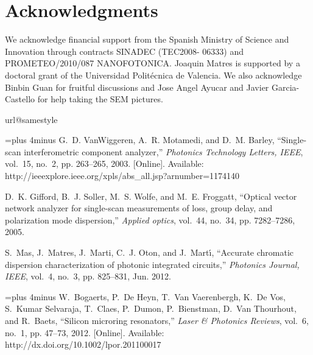 \documentclass[journal]{IEEEtran}
\begin{document}
\section*{Acknowledgments}
We acknowledge financial support from the Spanish Ministry of Science and Innovation through contracts SINADEC (TEC2008- 06333) and PROMETEO/2010/087 NANOFOTONICA. Joaquin Matres is supported by a doctoral grant of the Universidad Polit\'ecnica de Valencia. We also acknowledge Binbin Guan for fruitful discussions and Jose Angel Ayucar and Javier Garcia-Castello for help taking the SEM pictures.


\begin{thebibliography}{10}
\providecommand{\url}[1]{#1}
\csname url@samestyle\endcsname
\providecommand{\newblock}{\relax}
\providecommand{\bibinfo}[2]{#2}
\providecommand{\BIBentrySTDinterwordspacing}{\spaceskip=0pt\relax}
\providecommand{\BIBentryALTinterwordstretchfactor}{4}
\providecommand{\BIBentryALTinterwordspacing}{\spaceskip=\fontdimen2\font plus
\BIBentryALTinterwordstretchfactor\fontdimen3\font minus
  \fontdimen4\font\relax}
\providecommand{\BIBforeignlanguage}[2]{{%
\expandafter\ifx\csname l@#1\endcsname\relax
\typeout{** WARNING: IEEEtran.bst: No hyphenation pattern has been}%
\typeout{** loaded for the language `#1'. Using the pattern for}%
\typeout{** the default language instead.}%
\else
\language=\csname l@#1\endcsname
\fi
#2}}
\providecommand{\BIBdecl}{\relax}
\BIBdecl

\BIBentryALTinterwordspacing
G.~D. VanWiggeren, A.~R. Motamedi, and D.~M. Barley, ``{Single-scan
  interferometric component analyzer},'' \emph{Photonics Technology Letters,
  IEEE}, vol.~15, no.~2, pp. 263--265, 2003. [Online]. Available:
  \url{http://ieeexplore.ieee.org/xpls/abs\_all.jsp?arnumber=1174140}
\BIBentrySTDinterwordspacing

D.~K. Gifford, B.~J. Soller, M.~S. Wolfe, and M.~E. Froggatt, ``{Optical vector
  network analyzer for single-scan measurements of loss, group delay, and
  polarization mode dispersion},'' \emph{Applied optics}, vol.~44, no.~34, pp.
  7282--7286, 2005.

S.~Mas, J.~Matres, J.~Marti, C.~J. Oton, and J.~Mart\'{\i}, ``{Accurate
  chromatic dispersion characterization of photonic integrated circuits},''
  \emph{Photonics Journal, IEEE}, vol.~4, no.~3, pp. 825--831, Jun. 2012.

\BIBentryALTinterwordspacing
W.~Bogaerts, P.~{De Heyn}, T.~{Van Vaerenbergh}, K.~{De Vos}, S.~{Kumar
  Selvaraja}, T.~Claes, P.~Dumon, P.~Bienstman, D.~{Van Thourhout}, and
  R.~Baets, ``{Silicon microring resonators},'' \emph{Laser \& Photonics
  Reviews}, vol.~6, no.~1, pp. 47--73, 2012. [Online]. Available:
  \url{http://dx.doi.org/10.1002/lpor.201100017}
\BIBentrySTDinterwordspacing


\end{thebibliography}
\end{document}
